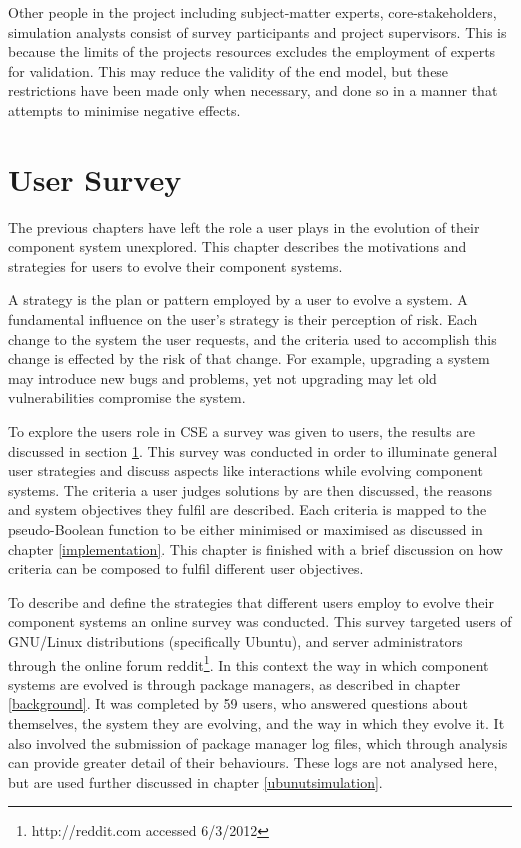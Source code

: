 Other people in the project including subject-matter experts, core-stakeholders, simulation analysts consist of survey participants and project supervisors.
This is because the limits of the projects resources excludes the employment of experts for validation.
This may reduce the validity of the end model, but these restrictions have been made only when necessary,
and done so in a manner that attempts to minimise negative effects.



\section{User Survey}
\label{strat.usersurvey}
The previous chapters have left the role a user plays in the evolution of their component system unexplored.
This chapter describes the motivations and strategies for users to evolve their component systems.

A strategy is the plan or pattern employed by a user to evolve a system.
A fundamental influence on the user's strategy is their perception of risk.
Each change to the system the user requests, and the criteria used to accomplish this change is effected by the risk of that change.
For example, upgrading a system may introduce new bugs and problems, yet not upgrading may let old vulnerabilities compromise the system.

To explore the users role in CSE a survey was given to users, the results are discussed in section \ref{strat.usersurvey}.
This survey was conducted in order to illuminate general user strategies and discuss aspects like interactions while evolving component systems.
The criteria a user judges solutions by are then discussed, the reasons and system objectives they fulfil are described.
Each criteria is mapped to the pseudo-Boolean function to be either minimised or maximised as discussed in chapter \ref{implementation}.
This chapter is finished with a brief discussion on how criteria can be composed to fulfil different user objectives. 

To describe and define the strategies that different users employ to evolve their component systems an online survey was conducted.
This survey targeted users of GNU/Linux distributions (specifically Ubuntu), and server administrators through the online forum reddit\footnote{http://reddit.com accessed 6/3/2012}.
In this context the way in which component systems are evolved is through package managers, as described in chapter \ref{background}.
It was completed by 59 users, who answered questions about themselves, the system they are evolving, and the way in which they evolve it.
It also involved the submission of package manager log files, which through analysis can provide greater detail of their behaviours.
These logs are not analysed here, but are used further discussed in chapter \ref{ubunutsimulation}.

